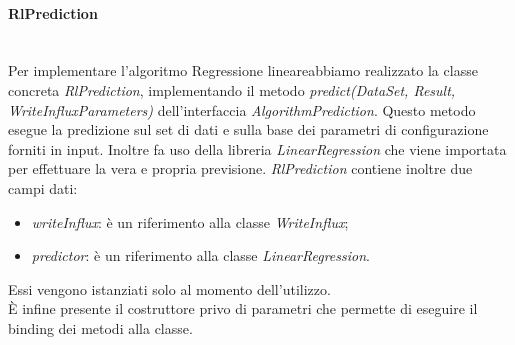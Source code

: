 \paragraph*{RlPrediction} \mbox{}\\ [1mm]
Per implementare l'algoritmo Regressione lineare\glosp abbiamo realizzato la classe concreta \textit{RlPrediction}, implementando il metodo \textit{predict(DataSet, Result, WriteInfluxParameters)} dell'interfaccia \textit{AlgorithmPrediction}.
Questo metodo esegue la predizione sul set di dati e sulla base dei parametri di configurazione forniti in input. Inoltre fa uso della libreria \textit{LinearRegression}  che viene importata per effettuare la vera e propria previsione. \textit{RlPrediction} contiene inoltre due campi dati:
\begin{itemize}
	\item \textit{writeInflux}: è un riferimento alla classe \textit{WriteInflux};
	\item \textit{predictor}: è un riferimento alla classe \textit{LinearRegression}.
\end{itemize}
Essi vengono istanziati solo al momento dell'utilizzo. \\
È infine presente il costruttore privo di parametri che permette di eseguire il binding dei metodi alla classe.

